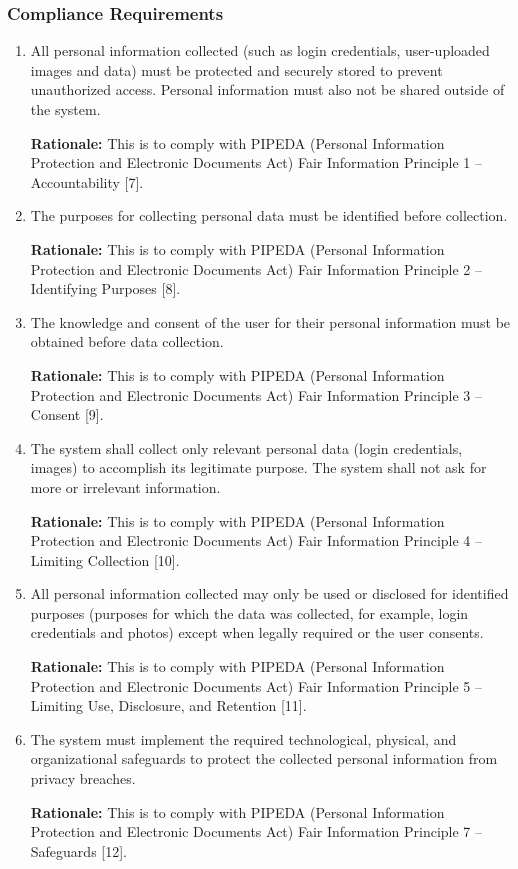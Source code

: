 \documentclass[]{article}
\begin{document}
\subsubsection{Compliance Requirements}
\label{ssub:compliance_requirements}
\begin{enumerate}[{LR-COMP}1. ]
	\item All personal information collected (such as login credentials, user-uploaded images and data) must be protected and securely stored to prevent unauthorized access. Personal information must also not be shared outside of the system. 

    {\bf Rationale:} This is to comply with PIPEDA (Personal Information Protection and Electronic Documents Act) Fair Information Principle 1 – Accountability [7].
    \item The purposes for collecting personal data must be identified before collection.

    {\bf Rationale:} This is to comply with PIPEDA (Personal Information Protection and Electronic Documents Act) Fair Information Principle 2 – Identifying Purposes [8].
    \item The knowledge and consent of the user for their personal information must be obtained before data collection.

    {\bf Rationale:} This is to comply with PIPEDA (Personal Information Protection and Electronic Documents Act) Fair Information Principle 3 – Consent [9].
    \item The system shall collect only relevant personal data (login credentials, images) to accomplish its legitimate purpose. The system shall not ask for more or irrelevant information.

    {\bf Rationale:} This is to comply with PIPEDA (Personal Information Protection and Electronic Documents Act) Fair Information Principle 4 – Limiting Collection [10].
    \item All personal information collected may only be used or disclosed for identified purposes (purposes for which the data was collected, for example, login credentials and photos) except when legally required or the user consents.

    {\bf Rationale:} This is to comply with PIPEDA (Personal Information Protection and Electronic Documents Act) Fair Information Principle 5 – Limiting Use, Disclosure, and Retention [11].
    \item The system must implement the required technological, physical, and organizational safeguards to protect the collected personal information from privacy breaches.

    {\bf Rationale:} This is to comply with PIPEDA (Personal Information Protection and Electronic Documents Act) Fair Information Principle 7 – Safeguards [12].
\end{enumerate}
\end{document}
